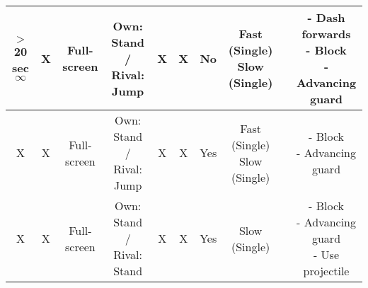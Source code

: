 \documentclass{article}
\begin{document}
\begin{landscape}
\begin{table}[h!]
\begin{center}
\begin{tabular*}{28cm}{c|c|c|c|c|c|c|c|c|c}
      \makecell{$>$ 20 sec \\ $\infty$} & X & Full-screen & Own: Stand / Rival: Jump & X & X & No & \makecell{Fast (Single) \\ Slow (Single)} & & \makecell{- Dash forwards \\ - Block \\ - Advancing guard}\\
      \hline
      X & X & Full-screen & Own: Stand / Rival: Jump & X & X & Yes & \makecell{Fast (Single) \\ Slow (Single)} & & \makecell {- Block \\ - Advancing guard}\\
      \hline
      X & X & Full-screen & Own: Stand / Rival: Stand & X & X & Yes & Slow (Single) & & \makecell{- Block \\ - Advancing guard \\ - Use projectile}\\
      \hline
       \end{tabular*}
  \end{center}
\end{table}

\end{landscape}
\newpage
\end{document}
